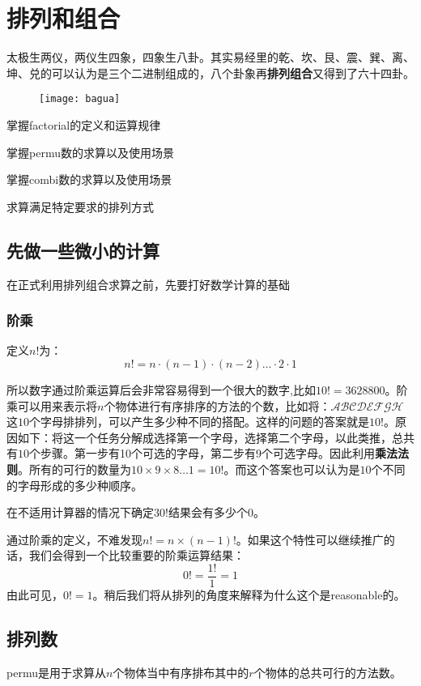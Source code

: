 \chapter{排列和组合}
太极生两仪，两仪生四象，四象生八卦。其实易经里的乾、坎、艮、震、巽、离、坤、兑的可以认为是三个二进制组成的，八个卦象再\textbf{排列组合}又得到了六十四卦。
\begin{figure}[H]
\centering
\texttt{[image: bagua]}
\end{figure}

\begin{todolist}
	\item 掌握\gls{factorial}的定义和运算规律
	\item 掌握\gls{permu}数的求算以及使用场景
	\item 掌握\gls{combi}数的求算以及使用场景
	\item 求算满足特定要求的排列方式
\end{todolist}
\clearpage

\section{先做一些微小的计算}
在正式利用排列组合求算之前，先要打好数学计算的基础

\subsection*{阶乘}
定义$n!$为：
\[
	n!=n\cdot (n-1)\cdot (n-2)\ldots\cdot 2 \cdot 1
\]

所以数字通过阶乘运算后会非常容易得到一个很大的数字,比如$10!=3628800$。阶乘可以用来表示将$n$个物体进行有序排序的方法的个数，比如将：$\mathcal{ABCDEFGH}$这$10$个字母排排列，可以产生多少种不同的搭配。这样的问题的答案就是$10!$。原因如下：将这一个任务分解成选择第一个字母，选择第二个字母，以此类推，总共有$10$个步骤。第一步有10个可选的字母，第二步有9个可选字母。因此利用\textbf{乘法法则}。所有的可行的数量为$10\times 9 \times 8 \ldots 1 = 10!$。而这个答案也可以认为是$10$个不同的字母形成的多少种顺序。

\begin{TaskBox}
在不适用计算器的情况下确定$30!$结果会有多少个$0$。
\end{TaskBox}

通过阶乘的定义，不难发现$n!=n\times (n-1)!$。如果这个特性可以继续推广的话，我们会得到一个比较重要的阶乘运算结果：
\[
	0!=\frac{1!}{1} = 1
\]
由此可见，$0!=1$。稍后我们将从排列的角度来解释为什么这个是reasonable的。


\section{排列数}
\gls{permu}是用于求算从$n$个物体当中有序排布其中的$r$个物体的总共可行的方法数。

